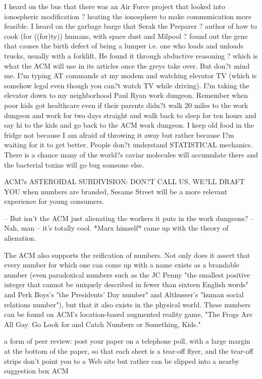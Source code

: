 I heard on the bus that there was an Air Force project that looked into ionospheric modification ? heating the ionosphere to make communication more feasible. I heard on the garbage barge that Serak the Preparer ? author of how to cook (for ((for)ty)) humans, with space dust and Milpool ? found out the gene that causes the birth defect of being a lumper i.e. one who loads and unloads trucks, usually with a forklift. He found it through abductive reasoning ? which is what the ACM will use in its articles once the greys take over. But don?t mind me. I?m typing AT commands at my modem and watching elevator TV (which is somehow legal even though you can?t watch TV while driving). I?m taking the elevator down to my neighborhood Paul Ryan work dungeon. Remember when poor kids got healthcare even if their parents didn?t walk 20 miles to the work dungeon and work for two days straight and walk back to sleep for ten hours and say hi to the kids and go back to the ACM work dungeon. I keep old food in the fridge not because I am afraid of throwing it away but rather because I?m waiting for it to get better. People don?t understand STATISTICAL mechanics. There is a chance many of the world?s caviar molecules will accumulate there and the bacterial toxins will go bug someone else.

ACM?s ASTEROIDAL SUBDIVISION: DON?T CALL US, WE?LL DRAFT YOU
when numbers are branded, Sesame Street will be a more relevant experience for young consumers.

-- But isn't the ACM just alienating the workers it puts in the work dungeons?
-- Nah, man -- it's totally cool. *Marx himself* came up with the theory of alienation.

The ACM also supports the reification of numbers. Not only does it assert that every number for which one can come up with a name exists as a brandable number (even paradoxical numbers such as the JC Penny "the smallest positive integer that cannot be uniquely described in fewer than sixteen English words" and Perk Boys's "the Presidents' Day number" and Althusser's "human social relations number"), but that it also exists in the physical world. These numbers can be found on ACM's location-based augmented reality game, "The Frogs Are All Gay. Go Look for and Catch Numbers or Something, Kids."


a form of peer review: post your paper on a telephone poll, with a large margin at the bottom of the paper, so that each sheet is a tear-off flyer, and the tear-off strips don't point you to a Web site but rather can be slipped into a nearby suggestion box ACM


